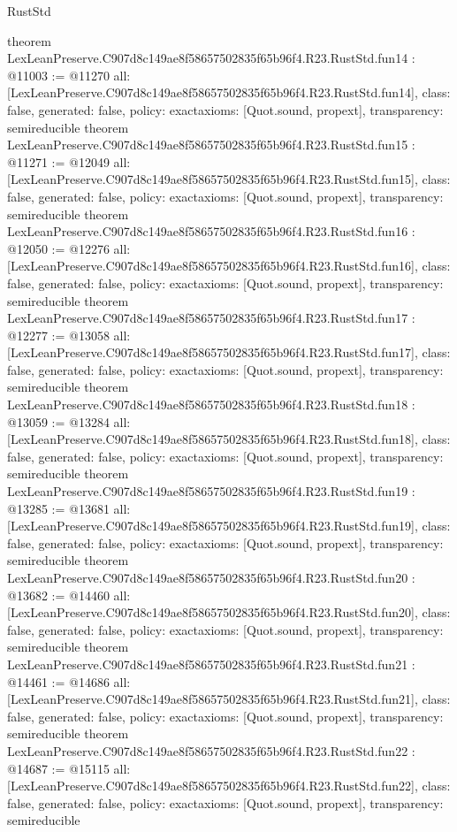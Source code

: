 \begin{lexlean}{RustStd}
\begin{coremodule}
{}
theorem LexLeanPreserve.C907d8c149ae8f58657502835f65b96f4.R23.RustStd.fun14 : @11003 := @11270 {
  all: [LexLeanPreserve.C907d8c149ae8f58657502835f65b96f4.R23.RustStd.fun14],
  class: false,
  generated: false,
  policy: exact{axioms: [Quot.sound, propext]},
  transparency: semireducible
}
theorem LexLeanPreserve.C907d8c149ae8f58657502835f65b96f4.R23.RustStd.fun15 : @11271 := @12049 {
  all: [LexLeanPreserve.C907d8c149ae8f58657502835f65b96f4.R23.RustStd.fun15],
  class: false,
  generated: false,
  policy: exact{axioms: [Quot.sound, propext]},
  transparency: semireducible
}
theorem LexLeanPreserve.C907d8c149ae8f58657502835f65b96f4.R23.RustStd.fun16 : @12050 := @12276 {
  all: [LexLeanPreserve.C907d8c149ae8f58657502835f65b96f4.R23.RustStd.fun16],
  class: false,
  generated: false,
  policy: exact{axioms: [Quot.sound, propext]},
  transparency: semireducible
}
theorem LexLeanPreserve.C907d8c149ae8f58657502835f65b96f4.R23.RustStd.fun17 : @12277 := @13058 {
  all: [LexLeanPreserve.C907d8c149ae8f58657502835f65b96f4.R23.RustStd.fun17],
  class: false,
  generated: false,
  policy: exact{axioms: [Quot.sound, propext]},
  transparency: semireducible
}
theorem LexLeanPreserve.C907d8c149ae8f58657502835f65b96f4.R23.RustStd.fun18 : @13059 := @13284 {
  all: [LexLeanPreserve.C907d8c149ae8f58657502835f65b96f4.R23.RustStd.fun18],
  class: false,
  generated: false,
  policy: exact{axioms: [Quot.sound, propext]},
  transparency: semireducible
}
theorem LexLeanPreserve.C907d8c149ae8f58657502835f65b96f4.R23.RustStd.fun19 : @13285 := @13681 {
  all: [LexLeanPreserve.C907d8c149ae8f58657502835f65b96f4.R23.RustStd.fun19],
  class: false,
  generated: false,
  policy: exact{axioms: [Quot.sound, propext]},
  transparency: semireducible
}
theorem LexLeanPreserve.C907d8c149ae8f58657502835f65b96f4.R23.RustStd.fun20 : @13682 := @14460 {
  all: [LexLeanPreserve.C907d8c149ae8f58657502835f65b96f4.R23.RustStd.fun20],
  class: false,
  generated: false,
  policy: exact{axioms: [Quot.sound, propext]},
  transparency: semireducible
}
theorem LexLeanPreserve.C907d8c149ae8f58657502835f65b96f4.R23.RustStd.fun21 : @14461 := @14686 {
  all: [LexLeanPreserve.C907d8c149ae8f58657502835f65b96f4.R23.RustStd.fun21],
  class: false,
  generated: false,
  policy: exact{axioms: [Quot.sound, propext]},
  transparency: semireducible
}
theorem LexLeanPreserve.C907d8c149ae8f58657502835f65b96f4.R23.RustStd.fun22 : @14687 := @15115 {
  all: [LexLeanPreserve.C907d8c149ae8f58657502835f65b96f4.R23.RustStd.fun22],
  class: false,
  generated: false,
  policy: exact{axioms: [Quot.sound, propext]},
  transparency: semireducible
}
\end{coremodule}
\end{lexlean}
